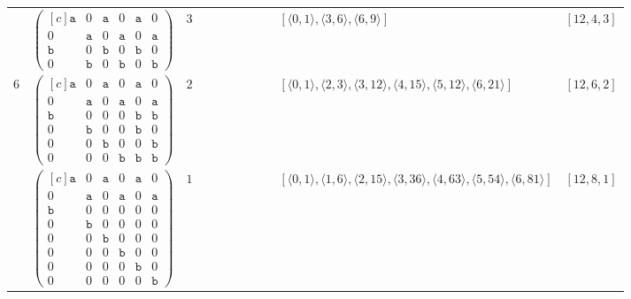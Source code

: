 \documentclass[12pt]{article}
\theoremstyle{definition}
\theoremstyle{plain}
\begin{document}
{\begin{longtable}{@{}cYcccccccZc@{}}
\cmidrule(lr){2-11}

& $\begin{pmatrix*}[c]
\mathtt{a}  &  0  &  \mathtt{a}  &  0  &  \mathtt{a}  &  0  \\
0  &  \mathtt{a}  &  0  &  \mathtt{a}  &  0  &  \mathtt{a}  \\
\mathtt{b}  &  0  &  \mathtt{b}  &  0  &  \mathtt{b}  &  0  \\
0  &  \mathtt{b}  &  0  &  \mathtt{b}  &  0  &  \mathtt{b}
\end{pmatrix*}$
& $3$
&
&
&
&
&
&
& $[\langle0,1\rangle,\allowbreak\langle3,6\rangle,\allowbreak\langle6,9\rangle]$
& $[12,4,3]$ \\


$6$
& $\begin{pmatrix*}[c]
\mathtt{a}  &  0  &  \mathtt{a}  &  0  &  \mathtt{a}  &  0  \\
0  &  \mathtt{a}  &  0  &  \mathtt{a}  &  0  &  \mathtt{a}  \\
\mathtt{b}  &  0  &  0  &  0  &  \mathtt{b}  &  \mathtt{b}  \\
0  &  \mathtt{b}  &  0  &  0  &  \mathtt{b}  &  0  \\
0  &  0  &  \mathtt{b}  &  0  &  0  &  \mathtt{b}  \\
0  &  0  &  0  &  \mathtt{b}  &  \mathtt{b}  &  \mathtt{b}
\end{pmatrix*}$
& $2$
&
&
&
&
&
&
& $[\langle0,1\rangle,\allowbreak\langle2,3\rangle,\allowbreak\langle3,12\rangle,\allowbreak\langle4,15\rangle,\allowbreak\langle5,12\rangle,\allowbreak\langle6,21\rangle]$
& $[12,6,2]$   \\

\cmidrule(lr){2-11}


& $\begin{pmatrix*}[c]
\mathtt{a}  &  0  &  \mathtt{a}  &  0  &  \mathtt{a}  &  0  \\
0  &  \mathtt{a}  &  0  &  \mathtt{a}  &  0  &  \mathtt{a}  \\
\mathtt{b}  &  0  &  0  &  0  &  0  &  0  \\
0  &  \mathtt{b}  &  0  &  0  &  0  & 0  \\
0  &  0  &  \mathtt{b}  &  0  &  0  & 0   \\
0  &  0  &  0  &  \mathtt{b}  &  0   &  0  \\
0  &  0  &  0  &  0  &  \mathtt{b}   &  0  \\
0  &  0  &  0  &  0  &  0   &  \mathtt{b}
\end{pmatrix*}$
& $1$
&
&
&
&
&
&
& $[\langle0,1\rangle,\allowbreak\langle1,6\rangle,\allowbreak\langle2,15\rangle,\allowbreak\langle3,36\rangle,\allowbreak\langle4,63\rangle,\allowbreak\langle5,54\rangle,\allowbreak\langle6,81\rangle]$
& $[12,8,1]$\\


\end{longtable}}
\end{document}
